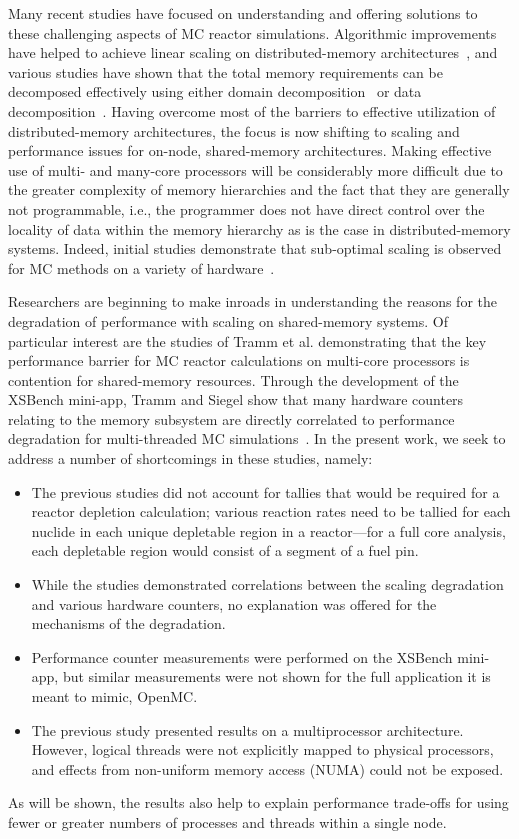 \documentclass{mc2015}
\begin{document}
Many recent studies have focused on understanding and offering solutions to
these challenging aspects of MC reactor simulations. Algorithmic improvements
have helped to achieve linear scaling on distributed-memory
architectures~\cite{nse-romano-2012, ane-romano-2013}, and various studies have
shown that the total memory requirements can be decomposed effectively using
either domain decomposition~\cite{jcp-siegel-2012, jcp-siegel-2013,
  physor-horelik-2014, pc-horelik-2014} or data
decomposition~\cite{jcp-romano-2013}. Having overcome most of the barriers to
effective utilization of distributed-memory architectures, the focus is now
shifting to scaling and performance issues for on-node, shared-memory
architectures. Making effective use of multi- and many-core processors will be
considerably more difficult due to the greater complexity of memory hierarchies
and the fact that they are generally not programmable, i.e., the programmer does
not have direct control over the locality of data within the memory hierarchy
as is the case in distributed-memory systems. Indeed, initial studies
demonstrate that sub-optimal scaling is observed for MC methods on a variety of
hardware~\cite{ijhpca-siegel-2014}.

Researchers are beginning to make inroads in understanding the reasons for the
degradation of performance with scaling on shared-memory systems. Of particular
interest are the studies of Tramm et al. demonstrating that the key performance
barrier for MC reactor calculations on multi-core processors is contention for
shared-memory resources. Through the development of the XSBench mini-app, Tramm
and Siegel show that many hardware counters relating to the memory subsystem
are directly correlated to performance degradation for multi-threaded MC
simulations~\cite{physor-tramm-2014, ane-tramm-2014}. In the present work, we
seek to address a number of shortcomings in these studies, namely:
\begin{itemize}
\item The previous studies did not account for tallies that would be required
  for a reactor depletion calculation; various reaction rates need to be
  tallied for each nuclide in each unique depletable region in a reactor---for
  a full core analysis, each depletable region would consist of a segment of a
  fuel pin.
\item While the studies demonstrated correlations between the scaling
  degradation and various hardware counters, no explanation was offered for the
  mechanisms of the degradation.
\item Performance counter measurements were performed on the XSBench mini-app,
  but similar measurements were not shown for the full application it is meant
  to mimic, OpenMC.
\item The previous study presented results on a multiprocessor architecture.
  However, logical threads were not explicitly mapped to physical processors,
  and effects from non-uniform memory access (NUMA) could not be exposed.
\end{itemize}
As will be shown, the results also help to explain performance trade-offs for
using fewer or greater numbers of processes and threads within a single node.
\end{document}
